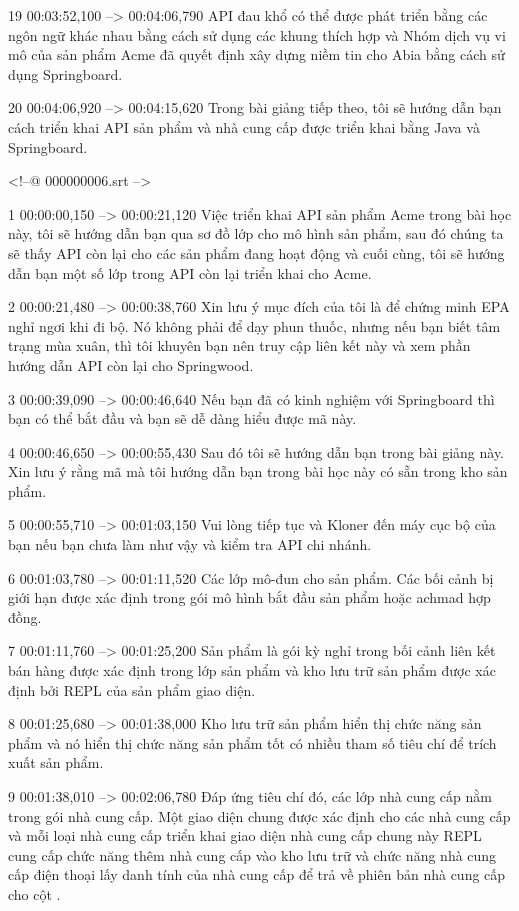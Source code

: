 19
00:03:52,100 --> 00:04:06,790
API đau khổ có thể được phát triển bằng các ngôn ngữ khác nhau bằng cách sử dụng các khung thích hợp và Nhóm dịch vụ vi mô của sản phẩm Acme đã quyết định xây dựng niềm tin cho Abia bằng cách sử dụng Springboard.

20
00:04:06,920 --> 00:04:15,620
Trong bài giảng tiếp theo, tôi sẽ hướng dẫn bạn cách triển khai API sản phẩm và nhà cung cấp được triển khai bằng Java và Springboard.

<!--@ 000000006.srt -->

1
00:00:00,150 --> 00:00:21,120
Việc triển khai API sản phẩm Acme trong bài học này, tôi sẽ hướng dẫn bạn qua sơ đồ lớp cho mô hình sản phẩm, sau đó chúng ta sẽ thấy API còn lại cho các sản phẩm đang hoạt động và cuối cùng, tôi sẽ hướng dẫn bạn một số lớp trong API còn lại  triển khai cho Acme.

2
00:00:21,480 --> 00:00:38,760
Xin lưu ý mục đích của tôi là để chứng minh EPA nghỉ ngơi khi đi bộ.  Nó không phải để dạy phun thuốc, nhưng nếu bạn biết tâm trạng mùa xuân, thì tôi khuyên bạn nên truy cập liên kết này và xem phần hướng dẫn API còn lại cho Springwood.

3
00:00:39,090 --> 00:00:46,640
Nếu bạn đã có kinh nghiệm với Springboard thì bạn có thể bắt đầu và bạn sẽ dễ dàng hiểu được mã này.

4
00:00:46,650 --> 00:00:55,430
Sau đó tôi sẽ hướng dẫn bạn trong bài giảng này.  Xin lưu ý rằng mã mà tôi hướng dẫn bạn trong bài học này có sẵn trong kho sản phẩm.

5
00:00:55,710 --> 00:01:03,150
Vui lòng tiếp tục và Kloner đến máy cục bộ của bạn nếu bạn chưa làm như vậy và kiểm tra API chi nhánh.

6
00:01:03,780 --> 00:01:11,520
Các lớp mô-đun cho sản phẩm.  Các bối cảnh bị giới hạn được xác định trong gói mô hình bắt đầu sản phẩm hoặc achmad hợp đồng.

7
00:01:11,760 --> 00:01:25,200
Sản phẩm là gói kỳ nghỉ trong bối cảnh liên kết bán hàng được xác định trong lớp sản phẩm và kho lưu trữ sản phẩm được xác định bởi REPL của sản phẩm giao diện.

8
00:01:25,680 --> 00:01:38,000
Kho lưu trữ sản phẩm hiển thị chức năng sản phẩm và nó hiển thị chức năng sản phẩm tốt có nhiều tham số tiêu chí để trích xuất sản phẩm.

9
00:01:38,010 --> 00:02:06,780
Đáp ứng tiêu chí đó, các lớp nhà cung cấp nằm trong gói nhà cung cấp.  Một giao diện chung được xác định cho các nhà cung cấp và mỗi loại nhà cung cấp triển khai giao diện nhà cung cấp chung này REPL cung cấp chức năng thêm nhà cung cấp vào kho lưu trữ và chức năng nhà cung cấp điện thoại lấy danh tính của nhà cung cấp để trả về phiên bản nhà cung cấp cho cột  .

